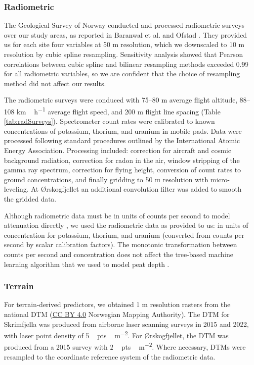 \documentclass[soil, manuscript]{copernicus}
\begin{document}
\subsubsection{Radiometric}

The Geological Survey of Norway conducted and processed radiometric surveys over our study areas, as reported in Baranwal et al. \citeyearpar{baranwalHelicopterborneMagneticElectromagnetic2013} and Ofstad \citeyearpar{ofstadHelicopterborneMagneticRadiometric2015}.
They provided us for each site four variables at 50 m resolution, which we downscaled to 10 m resolution by cubic spline resampling.
Sensitivity analysis showed that Pearson correlations between cubic spline and bilinear resampling methods exceeded 0.99 for all radiometric variables, so we are confident that the choice of resampling method did not affect our results.

The radiometric surveys were conduced with 75--80 m average flight altitude, 88--108 \unit{km\,h^{-1}} average flight speed, and 200 m flight line spacing (Table \ref{tab:radSurveys}).
Spectrometer count rates were calibrated to known concentrations of potassium, thorium, and uranium in mobile pads.
Data were processed following standard procedures outlined by the International Atomic Energy Association.
Processing included: correction for aircraft and cosmic background radiation, correction for radon in the air, window stripping of the gamma ray spectrum, correction for flying height, conversion of count rates to ground concentrations, and finally gridding to 50 m resolution with micro-leveling.
At Ørskogfjellet an additional convolution filter was added to smooth the gridded data.

Although radiometric data must be in units of counts per second to model attenuation directly \citep{olearyDigitalSoilMapping2022}, we used the radiometric data as provided to us: in units of concentration for potassium, thorium, and uranium (converted from counts per second by scalar calibration factors).
The monotonic transformation between counts per second and concentration does not affect the tree-based machine learning algorithm that we used to model peat depth \citep{hastieElementsStatisticalLearning2009}.

\subsubsection{Terrain}

For terrain-derived predictors, we obtained 1 m resolution rasters from the national DTM (\href{https://creativecommons.org/licenses/by/4.0/}{CC BY 4.0} Norwegian Mapping Authority).
The DTM for Skrimfjella was produced from airborne laser scanning surveys in 2015 and 2022, with laser point density of \unit{5\,pts\,m^{-2}}.
For Ørskogfjellet, the DTM was produced from a 2015 survey with \unit{2\,pts\,m^{-2}}.
Where necessary, DTMs were resampled to the coordinate reference system of the radiometric data.
\end{document}
